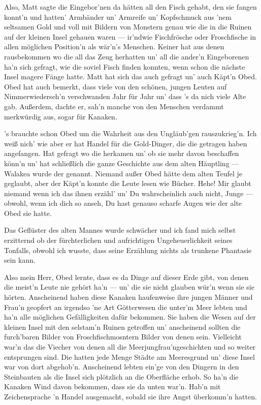 Also, Matt sagte die Eingebor'nen da hätten all den Fisch gehabt, den sie fangen konnt'n und hatten' Armbänder un' Armreife un' Kopfschmuck aus 'nem seltsamen Gold und voll mit Bildern von Monstern genau wie die in die Ruinen auf der kleinen Insel gehauen waren --- ir'ndwie Fischfrösche oder Froschfische in allen möglichen Position'n als wär'n's Menschen. Keiner hat aus denen rausbekommen wo die all das Zeug herhatten un' all die ander'n Eingeborenen ha'n sich gefragt, wie die soviel Fisch finden konnten, wenn schon die nächste Insel magere Fänge hatte. Matt hat sich das auch gefragt un' auch Käpt'n Obed. Obed hat auch bemerkt, dass viele von den schönen, jungen Leuten auf Nimmerwiederseh'n verschwanden Jahr für Jahr un' dass 's da nich viele Alte gab. Außerdem, dachte er, sah'n manche von den Menschen verdammt merkwürdig aus, sogar für Kanaken.

's brauchte schon Obed um die Wahrheit aus den Ungläub'gen rauszukrieg'n. Ich weiß nich' wie aber er hat Handel für die Gold-Dinger, die die getragen haben angefangen. Hat gefragt wo die herkamen un' ob sie mehr davon beschaffen könn'n un' hat schließlich die ganze Geschichte aus dem alten Häuptling --- Walakea wurde der genannt. Niemand außer Obed hätte dem alten Teufel je geglaubt, aber der Käpt'n konnte die Leute lesen wie Bücher. Hehe! Mir glaubt niemand wenn ich das ihnen erzähl' un' Du wahrscheinlich auch nicht, Junge --- obwohl, wenn ich dich so anseh, Du hast genauso scharfe Augen wie der alte Obed sie hatte.\grqq

Das Geflüster des alten Mannes wurde schwächer und ich fand mich selbst erzitternd ob der fürchterlichen und aufrichtigen Ungeheuerlichkeit seines Tonfalls, obwohl ich wusste, dass seine Erzählung nichts als trunkene Phantasie sein kann.

\glqq Also mein Herr, Obed lernte, dass es da Dinge auf dieser Erde gibt, von denen die meist'n Leute nie gehört ha'n --- un' die sie nicht glauben wür'n wenn sie sie hörten. Anscheinend haben diese Kanaken haufenweise ihre jungen Männer und Frau'n geopfert an irgendso 'ne Art Götterwesen die unter'm Meer lebten und ha'n alle möglichen Gefälligkeiten dafür bekommen. Sie haben die Wesen auf der kleinen Insel mit den selstam'n Ruinen getroffen un' anscheinend sollten die furch'baren Bilder von Froschfischmosntern Bilder von denen sein. Vielleicht war'n das die Viecher von denen all die Meerjungfrau'ngeschichten und so weiter entsprungen sind. Die hatten jede Menge Städte am Meeresgrund un' diese Insel war von dort abgehob'n. Anscheinend lebten ein'ge von den Dingern in den Steinbauten als die Insel sich plötzlich an die Oberfläche erhob. So ha'n die Kanaken Wind davon bekommen, dass sie da unten war'n. Hab'n mit Zeichensprache 'n Handel ausgemacht, sobald sie ihre Angst überkomm'n hatten.

